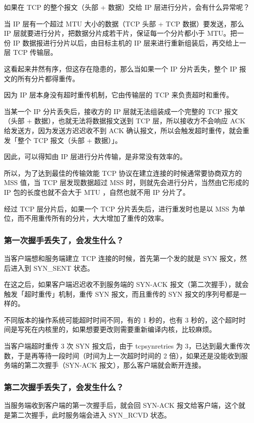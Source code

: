 \documentclass[11pt]{article}
\begin{document}
如果在 TCP 的整个报文（头部 + 数据）交给 IP 层进行分片，会有什么异常呢？

当 IP 层有一个超过 MTU 大小的数据（TCP 头部 + TCP 数据）要发送，那么 IP 层就要进行分片，把数据分片成若干片，保证每一个分片都小于 MTU。把一份 IP 数据报进行分片以后，由目标主机的 IP 层来进行重新组装后，再交给上一层 TCP 传输层。

这看起来井然有序，但这存在隐患的，那么当如果一个 IP 分片丢失，整个 IP 报文的所有分片都得重传。

因为 IP 层本身没有超时重传机制，它由传输层的 TCP 来负责超时和重传。

当某一个 IP 分片丢失后，接收方的 IP 层就无法组装成一个完整的 TCP 报文（头部 + 数据），也就无法将数据报文送到 TCP 层，所以接收方不会响应 ACK 给发送方，因为发送方迟迟收不到 ACK 确认报文，所以会触发超时重传，就会重发「整个 TCP 报文（头部 + 数据）」。

因此，可以得知由 IP 层进行分片传输，是非常没有效率的。

所以，为了达到最佳的传输效能 TCP 协议在建立连接的时候通常要协商双方的 MSS 值，当 TCP 层发现数据超过 MSS 时，则就先会进行分片，当然由它形成的 IP 包的长度也就不会大于 MTU ，自然也就不用 IP 分片了。

经过 TCP 层分片后，如果一个 TCP 分片丢失后，进行重发时也是以 MSS 为单位，而不用重传所有的分片，大大增加了重传的效率。

\subsubsection{第一次握手丢失了，会发生什么？}
\label{sec:org07a9adf}
当客户端想和服务端建立 TCP 连接的时候，首先第一个发的就是 SYN 报文，然后进入到 SYN\_SENT 状态。

在这之后，如果客户端迟迟收不到服务端的 SYN-ACK 报文（第二次握手），就会触发「超时重传」机制，重传 SYN 报文，而且重传的 SYN 报文的序列号都是一样的。

不同版本的操作系统可能超时时间不同，有的 1 秒的，也有 3 秒的，这个超时时间是写死在内核里的，如果想要更改则需要重新编译内核，比较麻烦。

当客户端超时重传 3 次 SYN 报文后，由于 tcpsynretries 为 3，已达到最大重传次数，于是再等待一段时间（时间为上一次超时时间的 2 倍），如果还是没能收到服务端的第二次握手（SYN-ACK 报文），那么客户端就会断开连接。

\subsubsection{第二次握手丢失了，会发生什么？}
\label{sec:org69886d0}
当服务端收到客户端的第一次握手后，就会回 SYN-ACK 报文给客户端，这个就是第二次握手，此时服务端会进入 SYN\_RCVD 状态。
\end{document}
